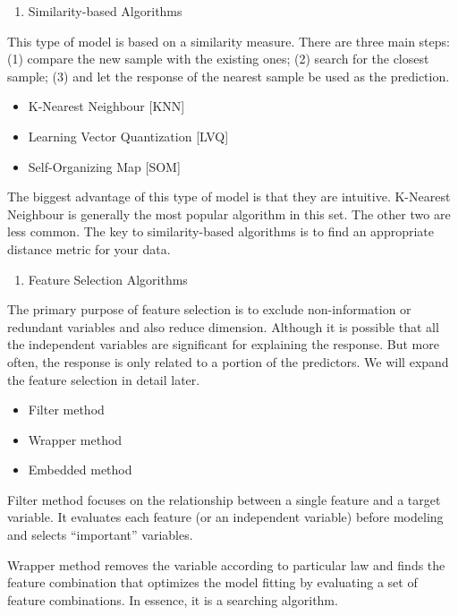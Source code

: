 \documentclass[12pt,]{krantz}
\providecommand{\tightlist}{%
  \setlength{\itemsep}{0pt}\setlength{\parskip}{0pt}}
\theoremstyle{definition}
\theoremstyle{definition}
\theoremstyle{remark}
\begin{document}
\begin{enumerate}
\def\labelenumi{\arabic{enumi}.}
\setcounter{enumi}{1}
\tightlist
\item
  Similarity-based Algorithms
\end{enumerate}

This type of model is based on a similarity measure. There are three
main steps: (1) compare the new sample with the existing ones; (2)
search for the closest sample; (3) and let the response of the nearest
sample be used as the prediction.

\begin{itemize}
\tightlist
\item
  K-Nearest Neighbour {[}KNN{]}
\item
  Learning Vector Quantization {[}LVQ{]}
\item
  Self-Organizing Map {[}SOM{]}
\end{itemize}

The biggest advantage of this type of model is that they are intuitive.
K-Nearest Neighbour is generally the most popular algorithm in this set.
The other two are less common. The key to similarity-based algorithms is
to find an appropriate distance metric for your data.

\begin{enumerate}
\def\labelenumi{\arabic{enumi}.}
\setcounter{enumi}{2}
\tightlist
\item
  Feature Selection Algorithms
\end{enumerate}

The primary purpose of feature selection is to exclude non-information
or redundant variables and also reduce dimension. Although it is
possible that all the independent variables are significant for
explaining the response. But more often, the response is only related to
a portion of the predictors. We will expand the feature selection in
detail later.

\begin{itemize}
\tightlist
\item
  Filter method
\item
  Wrapper method
\item
  Embedded method
\end{itemize}

Filter method focuses on the relationship between a single feature and a
target variable. It evaluates each feature (or an independent variable)
before modeling and selects ``important'' variables.

Wrapper method removes the variable according to particular law and
finds the feature combination that optimizes the model fitting by
evaluating a set of feature combinations. In essence, it is a searching
algorithm.
\end{document}
